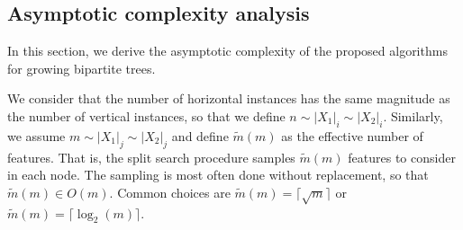%
%
%

\subsection{Asymptotic complexity analysis}
\label{sec:complexity_analysis}


In this section, we derive the asymptotic complexity of the proposed algorithms for growing bipartite trees.

We consider that the number of horizontal instances has the same magnitude as the number of vertical instances, so that we define $n \sim |X_1|_i \sim |X_2|_i$.
Similarly, we assume $m \sim |X_1|_j \sim |X_2|_j$ and define $\tilde m(m)$ as the effective number of features. That is, the split search procedure samples $\tilde m(m)$ features to consider in each node. The sampling is most often done without replacement, so that $\tilde m(m) \in O(m)$. Common choices are $\tilde m (m) = \lceil\sqrt{m}\rceil$ or $\tilde m (m) = \lceil \log_2(m) \rceil$.

